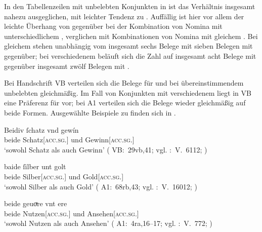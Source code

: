 In den Tabellenzeilen mit unbelebten Konjunkten in
 ist das Verhältnis insgesamt nahezu ausgeglichen,
mit leichter Tendenz zu . Auffällig ist hier vor allem der leichte
Überhang von  gegenüber  bei der Kombination von
Nomina mit unterschiedlichem , verglichen mit Kombinationen von
Nomina mit gleichem . Bei gleichem  stehen unabhängig vom
 insgesamt sechs Belege mit  sieben Belegen mit
 gegenüber; bei verschiedenem  beläuft sich die Zahl auf
insgesamt acht Belege mit  gegenüber insgesamt zwölf Belegen mit
.

Bei Handschrift VB verteilen sich die Belege für  und
 bei übereinstimmendem unbelebten 
gleichmäßig. Im Fall von Konjunkten mit verschiedenem  liegt in VB
eine Präferenz für  vor; bei A1 verteilen sich die Belege wieder
gleichmäßig auf beide Formen. Ausgewählte Beispiele zu 
finden sich in .

\begin{exe}
\ex \label{ex:konjbeidirreginan}
	\begin{xlist}
	\ex \gll Beidiv ſchatz vnd gewín \\
			beide Schatz[\textsc{acc.sg.\MascI}] und Gewinn[\textsc{acc.sg.\MascI}] \\
		\trans `sowohl Schatz als auch Gewinn'
			(%
				VB:~29vb,41; vgl.
				\KC:~V.~6112;
				\cite[194]{schroeder1895}%
			)
		\label{ex:konjbeidirreginan_1}

	\ex \gll baide ſilber unt golt \\
			beide Silber[\textsc{acc.sg.\NeutI}] und Gold[\textsc{acc.sg.\NeutI}] \\
		\trans `sowohl Silber als auch Gold'
			(%
				A1:~68rb,43; vgl.
				\KC:~V.~16012;
				\cite[370]{schroeder1895}%
			)
		\label{ex:konjbeidirreginan_2}

	\ex \gll beide geuoͮre vnt ere \\
			beide Nutzen[\textsc{acc.sg.\NeutI}] und Ansehen[\textsc{acc.sg.\FemI}] \\
		\trans `sowohl Nutzen als auch Ansehen'
			(%
				A1:~4ra,16--17; vgl.
				\KC:~V.~772;
				\cite[95]{schroeder1895}%
			)
		\label{ex:konjbeidirreginan_3}
	\end{xlist}
\end{exe}

